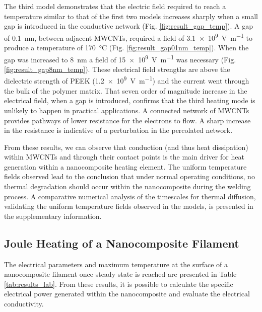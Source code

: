 \documentclass[11pt,review,times]{elsarticle}
\begin{document}
The third model demonstrates that the electric field required to reach a temperature similar to that of the first two models increases sharply when a small gap is introduced in the conductive network (Fig. \ref{fig:result_gap_temp}). 
A gap of \SI{0.1}{\nano\metre}, between adjacent MWCNTs, required a field of \SI{3.1e9}{\volt\per\metre} to produce a temperature of \SI{170}{\celsius} (Fig. \ref{fig:result_gap01nm_temp}). 
When the gap was increased to \SI{8}{\nano\metre} a field of \SI{15e9}{\volt\per\metre} was necessary (Fig. \ref{fig:result_gap8nm_temp}). 
These electrical field strengths are above the dielectric strength of PEEK (\SI{1.2e9}{\volt\per\metre}) and the current went through the bulk of the polymer matrix. 
That seven order of magnitude increase in the electrical field, when a gap is introduced, confirms that the third heating mode  is unlikely to happen in practical applications. 
A connected network of MWCNTs provides pathways of lower resistance for the electrons to flow. 
A sharp increase in the resistance is indicative of a perturbation in the percolated network. 

From these results, we can observe that conduction (and thus heat dissipation) within MWCNTs and through their contact points is the main driver for heat generation within a nanocomposite heating element. 
The uniform temperature fields observed lead to the conclusion that under normal operating conditions, no thermal degradation should occur within the nanocomposite during the welding process. 
A comparative numerical analysis of the timescales for thermal diffusion, validating the uniform temperature fields observed in the models, is presented in the supplementary information.  

\subsection{Joule Heating of a Nanocomposite Filament}

The electrical parameters and maximum temperature at the surface of a nanocomposite filament once steady state is reached are presented in Table \ref{tab:results_lab}. 
From these results, it is possible to calculate the specific electrical power generated within the nanocomposite and evaluate the electrical conductivity. 
\end{document}
